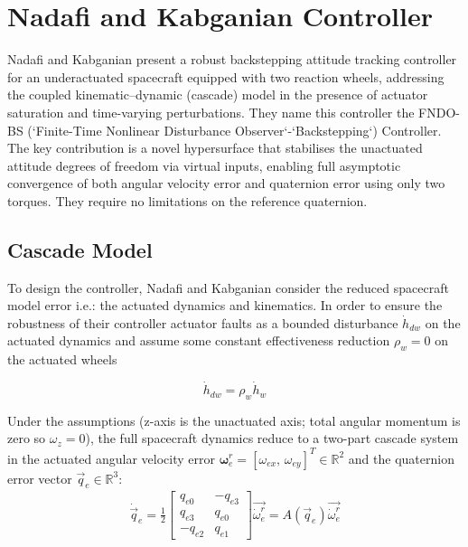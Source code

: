 \section{Nadafi and Kabganian Controller}

Nadafi and Kabganian \cite{nadafiRobustBacksteppingAttitude2021} present a robust backstepping attitude tracking controller for an underactuated spacecraft equipped with two reaction wheels, addressing the coupled kinematic--dynamic (cascade) model in the presence of actuator saturation and time-varying perturbations. They name this controller the FNDO-BS (`Finite-Time Nonlinear Disturbance Observer`-`Backstepping`) Controller. The key contribution is a novel hypersurface that stabilises the unactuated attitude degrees of freedom via virtual inputs, enabling full asymptotic convergence of both angular velocity error and quaternion error using only two torques. They require no limitations on the reference quaternion.

\subsection{Cascade Model}

To design the controller, Nadafi and Kabganian consider the reduced spacecraft model error i.e.: the actuated dynamics and kinematics. In order to ensure the robustness of their controller actuator faults as a bounded disturbance $\dot{h}_{dw}$ on the actuated dynamics and assume some constant effectiveness reduction $\rho_w = 0$ on the actuated wheels

\begin{equation}
    \dot{h}_{dw} = \rho_w \dot{h}_w
\end{equation}

Under the assumptions (z-axis is the unactuated axis; total angular momentum is zero so $\omega_z = 0$), the full spacecraft dynamics reduce to a two-part cascade system in the actuated angular velocity error $\boldsymbol{\omega}^r_e = [\omega_{ex},\, \omega_{ey}]^T \in \mathbb{R}^2$ and the quaternion error vector $\vec{q}_e \in \mathbb{R}^3$:
\begin{equation}
    \begin{split}
        \dot{\vec{q}}_e = \frac{1}{2}\begin{bmatrix}
            q_{e0} & -q_{e3} \\
            q_{e3} &  q_{e0} \\
            -q_{e2} &  q_{e1}
        \end{bmatrix} \label{eq:cascade_kin}
        \vec{\dot{\omega}_e^r}
        = A(\vec{q}_e)\vec{\dot{\omega}_e^r}
    \end{split}
\end{equation}

